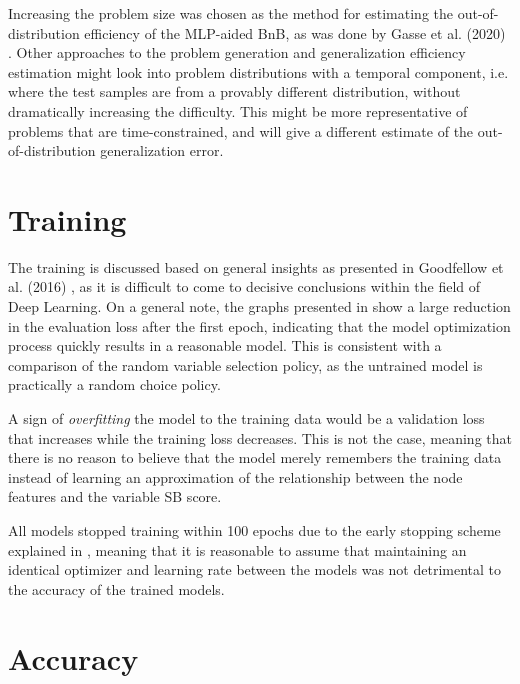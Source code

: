 Increasing the problem size was chosen as the method for estimating the out-of-distribution efficiency of the \gls{MLP}-aided \gls{BnB}, as was done by Gasse et al. (2020) \cite{gasse2019exact}. Other approaches to the problem generation and generalization efficiency estimation might look into problem distributions with a temporal component, i.e. where the test samples are from a provably different distribution, without dramatically increasing the difficulty. This might be more representative of problems that are time-constrained, and will give a different estimate of the out-of-distribution generalization error.  




\section{Training}\label{sec:disc_training}

The training is discussed based on general insights as presented in Goodfellow et al. (2016) \cite{goodfellow2016deep}, as it is difficult to come to decisive conclusions within the field of Deep Learning. On a general note, the graphs presented in  show a large reduction in the evaluation loss after the first epoch, indicating that the model optimization process quickly results in a reasonable model. This is consistent with a comparison of the random variable selection policy, as the untrained model is practically a random choice policy.  

A sign of \textit{overfitting} the model to the training data would be a validation loss that increases while the training loss decreases. This is not the case, meaning that there is no reason to believe that the model merely remembers the training data instead of learning an approximation of the relationship between the node features and the variable \gls{SB} score. 

All models stopped training within 100 epochs due to the early stopping scheme explained in , meaning that it is reasonable to assume that maintaining an identical optimizer and learning rate between the models was not detrimental to the accuracy of the trained models.  




\section{Accuracy}\label{sec:disc_accuracy}

